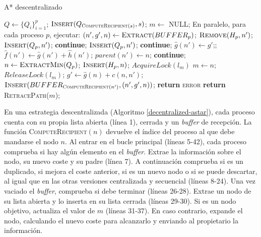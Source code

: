 \documentclass[a4paper,12pt]{article}
\begin{document}
\begin{algorithm}[H]
\caption{A* descentralizado}\label{decentralized-astar}
\begin{algorithmic}[1]
\small
\State $Q \gets \{Q_i\}_{i=1}^p$;
\State $\textsc{Insert}(Q_{\textsc{ComputeRecipient}(s)}, s)$;
\State $m \gets$ NULL;
\State En paralelo, para cada proceso $p$, ejecutar:
        \State $(n', g', n) \gets \textsc{Extract}(BUFFER_p)$;
                \State $\textsc{Remove}(H_p, n')$;
                \State $\textsc{Insert}(Q_p, n')$;
            \Else
                \State \textbf{continue};
            \EndIf
        \Else
                \State $\textsc{Insert}(Q_p, n')$;
                \State \textbf{continue};
            \EndIf
        \EndIf
        \State $\hat{g}(n') \gets g'$;;
        \State $\hat{f}(n') \gets \hat{g}(n') + \hat{h}(n')$;
        \State $parent(n') \gets n$;
    \EndWhile
        \State \textbf{continue};
    \EndIf
    \State $n \gets \textsc{ExtractMin}(Q_p)$;
    \State $\textsc{Insert}(H_p, n)$;
        \State $AcquireLock(l_m)$
            \State $m \gets n$;
        \EndIf
        \State $ReleaseLock(l_m)$;
    \EndIf
        \State $g' \gets \hat{g}(n) + c(n, n')$;
        \State $\textsc{Insert}(BUFFER_{\textsc{ComputeRecipient}(n')}, (n', g', n))$;
    \EndFor
\EndWhile
{}
    \State \textbf{return} \textsc{error}
\EndIf
\State \textbf{return} \textsc{RetracePath}($m$);
\end{algorithmic}
\end{algorithm}

En una estrategia descentralizada (Algoritmo \ref{decentralized-astar}), cada proceso cuenta con su propia lista abierta (línea 1), cerrada y un \textit{buffer} de recepción. La función \textsc{ComputeRecipient}$(n)$ devuelve el índice del proceso al que debe mandarse el nodo $n$. Al entrar en el bucle principal (líneas 5-42), cada proceso comprueba si hay algún elemento en el \textit{buffer}. Extrae la información sobre el nodo, su nuevo coste y su padre (línea 7). A continuación comprueba si es un duplicado, si mejora el coste anterior, si es un nuevo nodo o si se puede descartar, al igual que en las otras versiones centralizada y secuencial (líneas 8-24). Una vez vaciado el \textit{buffer}, comprueba si debe terminar (líneas 26-28). Extrae un nodo de su lista abierta y lo inserta en su lista cerrada (líneas 29-30). Si es un nodo objetivo, actualiza el valor de $m$ (líneas 31-37). En caso contrario, expande el nodo, calculando el nuevo coste para alcanzarlo y enviando al propietario la información.
\end{document}
